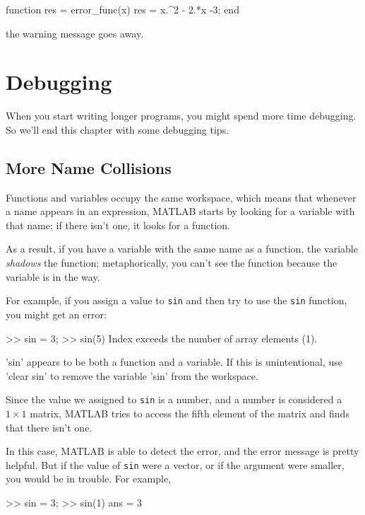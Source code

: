 \begin{code}
function res = error_func(x)
    res = x.^2 - 2.*x -3;
end
\end{code}
the warning message goes away.

\section{Debugging}

When you start writing longer programs, you might spend more time debugging.  So we'll end this chapter with some debugging tips.

\subsection{More Name Collisions}

Functions and variables occupy the same workspace, which means
that whenever a name appears in an expression, MATLAB starts by looking
for a variable with that name; if there isn't one, it looks for
a function.


As a result, if you have a variable with the same name as a function,
the variable \emph{shadows} the function; metaphorically, you can't see the function because the variable is in the way.

For example, if you assign
a value to \lstinline{sin} and then try to use the \lstinline{sin} function, you
might get an error:

\begin{code}
>> sin = 3;
>> sin(5)
Index exceeds the number of array elements (1).

'sin' appears to be both a function and a variable.
If this is unintentional, use 'clear sin' to remove
the variable 'sin' from the workspace.
\end{code}

Since the value we assigned to \lstinline{sin} is a number, and a number is considered a $1 \times 1$ matrix, MATLAB tries to access the fifth element of the matrix and finds that there isn't one.

In this case, MATLAB is able to detect the error, and the error message is pretty helpful.
But if the value of \lstinline{sin} were a vector, or if the argument were smaller, you would be in trouble.  For example,

\begin{code}
>> sin = 3;
>> sin(1)
ans = 3
\end{code}

